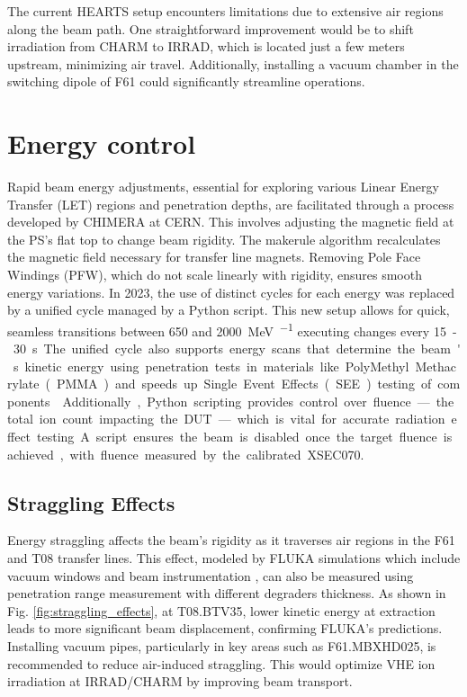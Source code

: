 \documentclass[a4paper,
               biblatex,     %
               ]{jacow}
\begin{document}
The current HEARTS setup encounters limitations due to extensive air regions along the beam path. One straightforward improvement would be to shift irradiation from CHARM to IRRAD, which is located just a few meters upstream, minimizing air travel. Additionally, installing a vacuum chamber in the switching dipole of F61 could significantly streamline operations.






\section{Energy control}

Rapid beam energy adjustments, essential for exploring various Linear Energy Transfer (LET) regions and penetration depths, are facilitated through a process developed by CHIMERA at CERN. This involves adjusting the magnetic field at the PS's flat top to change beam rigidity. The makerule algorithm recalculates the magnetic field necessary for transfer line magnets. Removing Pole Face Windings (PFW), which do not scale linearly with rigidity, ensures smooth energy variations. In 2023, the use of distinct cycles for each energy was replaced by a unified cycle managed by a Python script. This new setup allows for quick, seamless transitions between \SI{650}{} and \SI{2000}{\mega\electronvolt\per\nucleon} executing changes every \SI{15}-\SI{30}{\second}. The unified cycle also supports energy scans that determine the beam's kinetic energy using penetration tests in materials like PolyMethyl Methacrylate (PMMA) and speeds up Single Event Effects (SEE) testing of components \cite{noauthor_hearts_nodate}. Additionally, Python scripting provides control over fluence—the total ion count impacting the DUT—which is vital for accurate radiation effect testing. A script ensures the beam is disabled once the target fluence is achieved, with fluence measured by the calibrated XSEC070.

\subsection{Straggling Effects}
Energy straggling affects the beam's rigidity as it traverses air regions in the F61 and T08 transfer lines. This effect, modeled by FLUKA simulations which include vacuum windows and beam instrumentation \cite{battistoni_overview_2015}, can also be measured using penetration range measurement with different degraders thickness. As shown in Fig. \ref{fig:straggling_effects}, at T08.BTV35, lower kinetic energy at extraction leads to more significant beam displacement, confirming FLUKA's predictions. Installing vacuum pipes, particularly in key areas such as F61.MBXHD025, is recommended to reduce air-induced straggling. This would optimize VHE ion irradiation at IRRAD/CHARM by improving beam transport.
\end{document}
